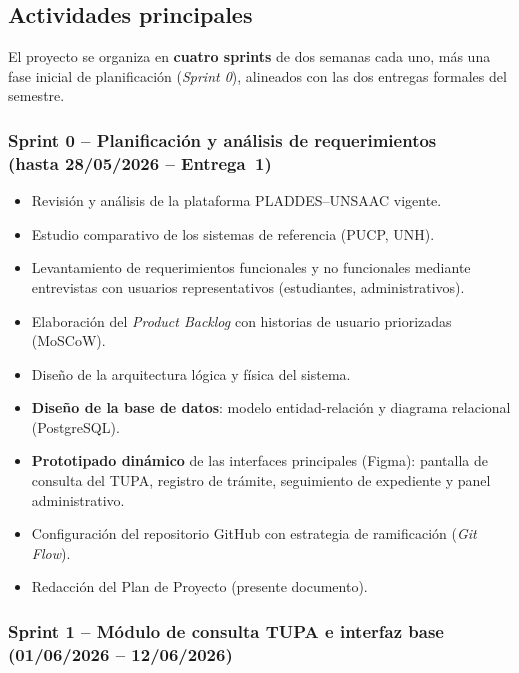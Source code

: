 \subsection{Actividades principales}

El proyecto se organiza en \textbf{cuatro sprints} de dos semanas cada uno, más
una fase inicial de planificación (\textit{Sprint 0}), alineados con las dos
entregas formales del semestre.

\subsubsection{Sprint 0 -- Planificación y análisis de requerimientos\\(hasta 28/05/2026 -- Entrega~1)}

\begin{itemize}
  \item Revisión y análisis de la plataforma PLADDES--UNSAAC vigente.
  \item Estudio comparativo de los sistemas de referencia (PUCP, UNH).
  \item Levantamiento de requerimientos funcionales y no funcionales mediante
    entrevistas con usuarios representativos (estudiantes, administrativos).
  \item Elaboración del \textit{Product Backlog} con historias de usuario
    priorizadas (MoSCoW).
  \item Diseño de la arquitectura lógica y física del sistema.
  \item \textbf{Diseño de la base de datos}: modelo entidad-relación y diagrama
    relacional (PostgreSQL).
  \item \textbf{Prototipado dinámico} de las interfaces principales (Figma):
    pantalla de consulta del TUPA, registro de trámite, seguimiento de
    expediente y panel administrativo.
  \item Configuración del repositorio GitHub con estrategia de ramificación
    (\textit{Git Flow}).
  \item Redacción del Plan de Proyecto (presente documento).
\end{itemize}

\subsubsection{Sprint 1 -- Módulo de consulta TUPA e interfaz base
(01/06/2026 -- 12/06/2026)}

